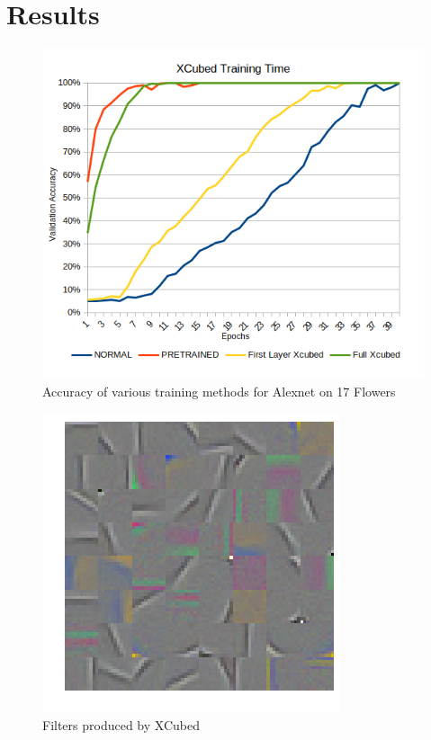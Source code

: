 \documentclass[twocolumn]{article}
\begin{document}
\section{Results}
\begin{figure}[ht]
    \centering
    \includegraphics[width=.8\linewidth]{X3GRAPH}
    \caption{Accuracy of various training methods for Alexnet on 17 Flowers}
    \label{fig:netspeedup}
\end{figure}
\begin{figure}[ht]
    \centering
    \includegraphics[width=.8\linewidth]{x3filters}
    \caption{Filters produced by XCubed}
    \label{fig:x3weights}
\end{figure}
\end{document}
